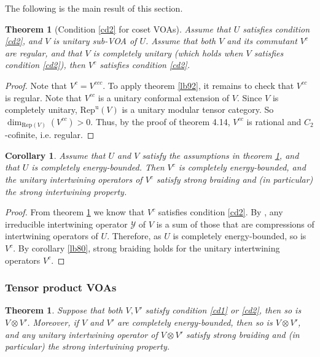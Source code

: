 \documentclass[11pt,b5paper,notitlepage]{article}
\theoremstyle{definition}
\theoremstyle{plain}
\newtheorem{thm}[df]{Theorem}
\newtheorem{co}[df]{Corollary}
\newcommand{\mc}{\mathcal}
\newcommand{\Rep}{\mathrm{Rep}}
\newcommand{\Repu}{\mathrm{Rep}^{\mathrm u}}
\numberwithin{equation}{subsection}
\begin{document}
The following is the main result of this section.

\begin{thm}[Condition \ref{cd2} for coset VOAs]\label{lb93}
Assume that $U$ satisfies condition \ref{cd2}, and $V$ is  unitary sub-VOA of $U$. Assume that both $V$ and its commutant $V^c$ are regular, and that $V$ is completely unitary (which holds when $V$ satisfies condition \ref{cd2}), then $V^c$ satisfies condition \ref{cd2}.
\end{thm}

\begin{proof}
Note that $V^c=V^{ccc}$. To apply theorem \ref{lb92}, it remains to check that $V^{cc}$ is regular. Note that $V^{cc}$ is a unitary conformal extension of $V$. Since $V$ is completely unitary, $\Repu(V)$ is a unitary modular tensor category. So $\dim_{\Rep(V)}(V^{cc})>0$. Thus, by the proof of \cite{McR19} theorem 4.14, $V^{cc}$ is rational and $C_2$-cofinite, i.e. regular.
\end{proof}





\begin{co}\label{lb79}
Assume that $U$ and $V$ satisfy the assumptions in theorem \ref{lb93}, and that $U$ is completely energy-bounded. Then  $V^c$ is completely energy-bounded, and the unitary intertwining operators of $V^c$  satisfy strong braiding and (in particular) the strong intertwining property.
\end{co}

\begin{proof}
From theorem \ref{lb93} we know that $V^c$ satisfies condition \ref{cd2}.  By \cite{Gui20a}, any irreducible intertwining operator $\mc Y$ of $V$ is a sum of those that are compressions of intertwining operators of $U$. Therefore, as $U$ is completely energy-bounded, so is $V^c$. By corollary \ref{lb80},   strong braiding holds for the unitary intertwining operators $V^c$.
\end{proof}



\subsubsection*{Tensor product VOAs}



\begin{thm}\label{lb83}
Suppose that both $V,V'$ satisfy condition \ref{cd1} or \ref{cd2}, then so is $V\otimes V'$. Moreover, if $V$ and $V'$ are completely energy-bounded, then so is $V\otimes V'$, and any unitary intertwining operator of $V\otimes V'$ satisfy strong braiding and (in particular) the strong intertwining property.
\end{thm}
\end{document}
